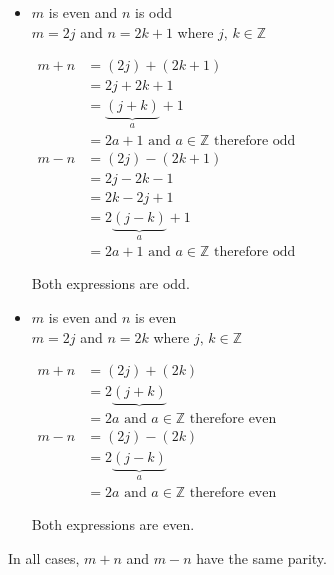 \documentclass[letterpaper,fleqn]{article}
\begin{document}
\begin{enumerate}
{\begin{enumerate}
\begin{itemize}
				\item $m$ is even and $n$ is odd \\
				$m=2j$ and $n=2k+1$ where $j,\, k \in \mathbb{Z}$
				\begin{multicols}{2}
					$\begin{aligned}
						m+n &= (2j)+(2k+1) \\
						&= 2j+2k+1 \\
						&= \underbrace{(j+k)}_a+1 \\
						&= \text{$2a+1$ and $a \in \mathbb{Z}$ therefore odd}
					\end{aligned}$
					\columnbreak
					\\
					$\begin{aligned}
						m-n &= (2j)-(2k+1) \\
						&= 2j-2k-1 \\
						&= 2k-2j+1 \\
						&= 2\underbrace{(j-k)}_a+1 \\
						&= \text{$2a+1$ and $a \in \mathbb{Z}$ therefore odd}
					\end{aligned}$
				\end{multicols}
				Both expressions are odd.
				
				\item $m$ is even and $n$ is even \\
				$m=2j$ and $n=2k$ where $j,\, k \in \mathbb{Z}$
				\begin{multicols}{2}
					$\begin{aligned}
						m+n &= (2j)+(2k) \\
						&= 2\underbrace{(j+k)} \\
						&= \text{$2a$ and $a \in \mathbb{Z}$ therefore even}
					\end{aligned}$
					\columnbreak
					\\
					$\begin{aligned}
						m-n &= (2j)-(2k) \\
						&= 2\underbrace{(j-k)}_a \\
						&= \text{$2a$ and $a \in \mathbb{Z}$ therefore even}
					\end{aligned}$
				\end{multicols}
				Both expressions are even.
			\end{itemize}
			In all cases, $m+n$ and $m-n$ have the same parity.
		\end{enumerate}
		}
		

\end{enumerate}
\end{document}
